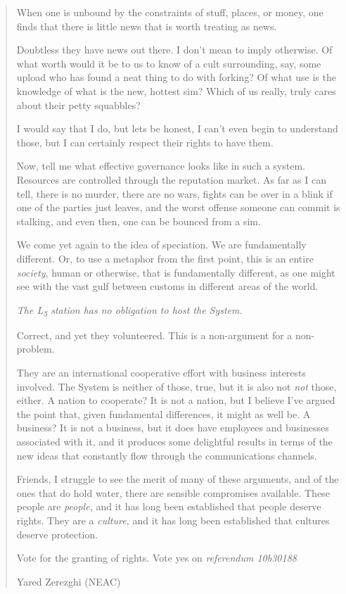 \begin{quote}
When one is unbound by the constraints of stuff, places, or money, one finds that there is little news that is worth treating as news.

Doubtless they have news out there. I don't mean to imply otherwise. Of what worth would it be to us to know of a cult surrounding, say, some upload who has found a neat thing to do with forking? Of what use is the knowledge of what is the new, hottest sim? Which of us really, truly cares about their petty squabbles?

I would say that I do, but lets be honest, I can't even begin to understand those, but I can certainly respect their rights to have them.

Now, tell me what effective governance looks like in such a system. Resources are controlled through the reputation market. As far as I can tell, there is no murder, there are no wars, fights can be over in a blink if one of the parties just leaves, and the worst offense someone can commit is stalking, and even then, one can be bounced from a sim.

We come yet again to the idea of speciation. We are fundamentally different. Or, to use a metaphor from the first point, this is an entire \emph{society}, human or otherwise, that is fundamentally different, as one might see with the vast gulf between customs in different areas of the world.

\emph{The L\textsubscript{5} station has no obligation to host the System.}

Correct, and yet they volunteered. This is a non-argument for a non-problem.

They are an international cooperative effort with business interests involved. The System is neither of those, true, but it is also not \emph{not} those, either. A nation to cooperate? It is not a nation, but I believe I've argued the point that, given fundamental differences, it might as well be. A business? It is not a business, but it does have employees and businesses associated with it, and it produces some delightful results in terms of the new ideas that constantly flow through the communications channels.

Friends, I struggle to see the merit of many of these arguments, and of the ones that do hold water, there are sensible compromises available. These people are \emph{people,} and it has long been established that people deserve rights. They are a \emph{culture,} and it has long been established that cultures deserve protection.

Vote for the granting of rights. Vote yes on \emph{referendum 10b30188}

Yared Zerezghi (NEAC)
\end{quote}
